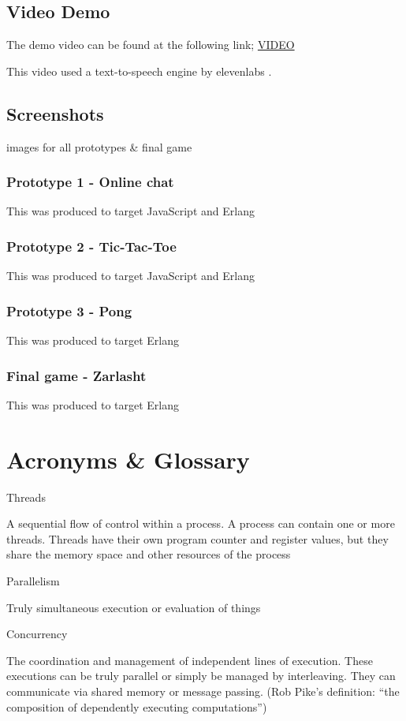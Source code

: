 \documentclass[]{final}
\begin{document}
\section{Video Demo}
The demo video can be found at the following link; \href{https://youtu.be/jvWuQHjNPdc}{VIDEO}

This video used a text-to-speech engine by elevenlabs \cite{noauthor_ai_nodate}.

\section{Screenshots}
images for all prototypes \& final game%
\subsection{Prototype 1 - Online chat}
This was produced to target JavaScript and Erlang%
\subsection{Prototype 2 - Tic-Tac-Toe}
This was produced to target JavaScript and Erlang%
\subsection{Prototype 3 - Pong}
This was produced to target Erlang%
\subsection{Final game - Zarlasht}
This was produced to target Erlang%

\chapter{Acronyms \& Glossary}
Threads

A sequential flow of control within a process. A process can contain one or more threads.
Threads have their own program counter and register values, but they share the memory space
and other resources of the process

Parallelism

Truly simultaneous execution or evaluation of things

Concurrency

The coordination and management of independent lines of execution. These executions
can be truly parallel or simply be managed by interleaving. They can communicate
via shared memory or message passing. (Rob Pike's definition: “the composition of
dependently executing computations”)
\end{document}
